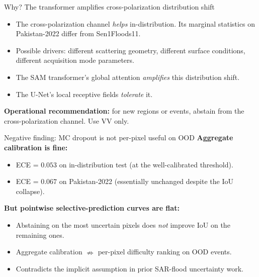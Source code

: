 \documentclass[aspectratio=169,11pt]{beamer}
\begin{document}
\begin{frame}{Why? The transformer amplifies cross-polarization distribution shift}
\begin{itemize}
    \item The cross-polarization channel \emph{helps} in-distribution. Its marginal statistics on Pakistan-2022 differ from Sen1Floods11.
    \item Possible drivers: different scattering geometry, different surface conditions, different acquisition mode parameters.
    \item The SAM transformer's global attention \emph{amplifies} this distribution shift.
    \item The U-Net's local receptive fields \emph{tolerate} it.
\end{itemize}
\vspace{0.6em}
\textbf{Operational recommendation:} for new regions or events, abstain from the cross-polarization channel. Use VV only.
\end{frame}

\begin{frame}{Negative finding: MC dropout is not per-pixel useful on OOD}
\textbf{Aggregate calibration is fine:}
\begin{itemize}
    \item ECE = $0.053$ on in-distribution test (at the well-calibrated threshold).
    \item ECE = $0.067$ on Pakistan-2022 (essentially unchanged despite the IoU collapse).
\end{itemize}
\vspace{0.6em}

\textbf{But pointwise selective-prediction curves are flat:}
\begin{itemize}
    \item Abstaining on the most uncertain pixels does \emph{not} improve IoU on the remaining ones.
    \item Aggregate calibration $\nRightarrow$ per-pixel difficulty ranking on OOD events.
    \item Contradicts the implicit assumption in prior SAR-flood uncertainty work.
\end{itemize}
\end{frame}
\end{document}
